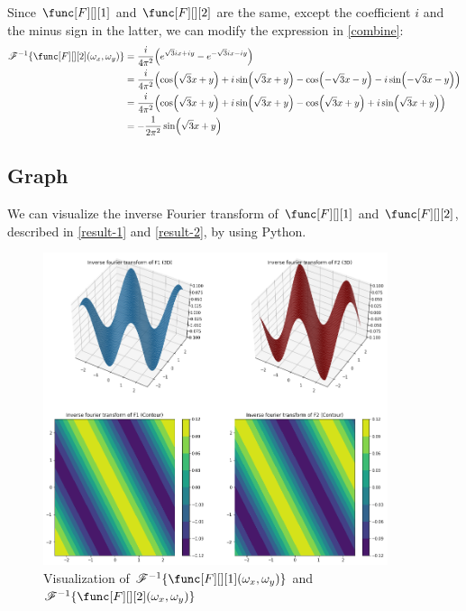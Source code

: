 Since $\func[F][][1]$ and $\func[F][][2]$ are the same, except the coefficient $i$ and the minus sign in the latter, we can modify the expression in \eqref{combine}:
\begin{align}
\invfourier{\func[F][][2](\omega_x,\omega_y)} 
&= \frac{i}{4\pi^2} \parens*{{e^{\sqrt{3} ix + iy}} - {e^{-\sqrt{3} ix - iy}}} \\
&= \frac{i}{4\pi^2} \parens*{\cos(\sqrt{3}x + y) + i\sin(\sqrt{3}x + y) - \cos(-\sqrt{3}x - y) - i\sin(-\sqrt{3}x - y)} \\
&= \frac{i}{4\pi^2} \parens*{\cos(\sqrt{3}x + y) + i\sin(\sqrt{3}x + y) - \cos(\sqrt{3}x + y) + i\sin(\sqrt{3}x + y)} \\
&= -\frac{1}{2\pi^2} \sin(\sqrt{3}x + y) \label{result-2}
\end{align}

\subsection{Graph}
We can visualize the inverse Fourier transform of $\func[F][][1]$ and $\func[F][][2]$, described in \eqref{result-1} and \eqref{result-2}, by using Python.

\begin{figure}[h]
    \centering
    \includegraphics[width=0.9\textwidth]{figures/assignment1/cg1-assignment1.png}
    \caption{Visualization of $\invfourier{\func[F][][1](\omega_x,\omega_y)}$ and $\invfourier{\func[F][][2](\omega_x,\omega_y)}$}
\end{figure}

